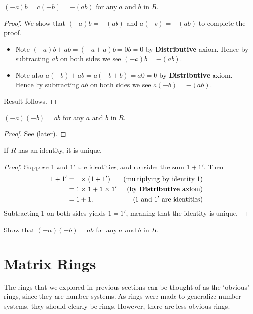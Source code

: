 \begin{proposition}\label{prop-product-of-element-and-additive-inverse-is-additive-inverse-of-product}
    $(-a)b = a(-b) = -(ab)$ for any $a$ and $b$ in $R$.
\end{proposition}
\begin{proof}
    We show that $(-a)b = -(ab)$ and $a(-b) = -(ab)$ to complete the proof.
    \begin{itemize}
        \item Note $(-a)b + ab = (-a + a)b = 0b = 0$ by \textbf{Distributive} axiom. Hence by subtracting $ab$ on both sides we see $(-a)b = -(ab)$.
        \item Note also $a(-b) + ab = a(-b + b) = a0 = 0$ by \textbf{Distributive} axiom. Hence by subtracting $ab$ on both sides we see $a(-b) = -(ab)$.
    \end{itemize}
    Result follows.
\end{proof}

\begin{proposition}
    $(-a)(-b) = ab$ for any $a$ and $b$ in $R$.
\end{proposition}
\begin{proof}
    See  (later).
\end{proof}

\begin{proposition}
    If $R$ has an identity, it is unique.
\end{proposition}
\begin{proof}
    Suppose 1 and $1'$ are identities, and consider the sum $1 + 1'$. Then
    \begin{align*}
        1 + 1' &= 1\times(1+1') & (\text{multiplying by identity }1)\\
        &= 1\times1 + 1\times1' & (\text{by \textbf{Distributive} axiom})\\
        &= 1 + 1. & (1 \text{ and } 1' \text{ are identities})
    \end{align*}
    Subtracting 1 on both sides yields $1 = 1'$, meaning that the identity is unique.
\end{proof}

\begin{exercise}\label{exercise-product-of-additive-inverses}
    Show that $(-a)(-b) = ab$ for any $a$ and $b$ in $R$.
\end{exercise}

\section{Matrix Rings}
The rings that we explored in previous sections can be thought of as the `obvious' rings, since they are number systems. As rings were made to generalize number systems, they should clearly be rings. However, there are less obvious rings.

